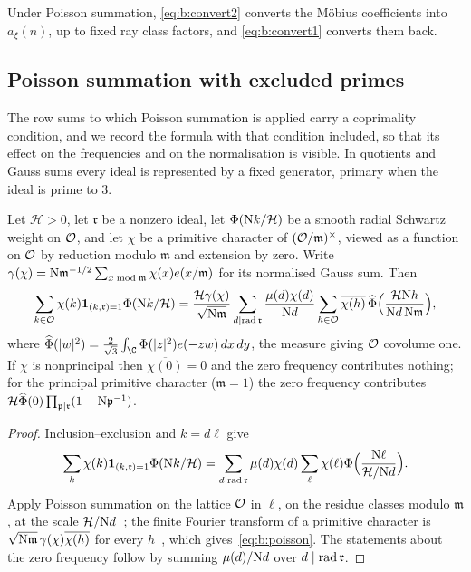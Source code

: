 Under Poisson summation, \eqref{eq:b:convert2} converts the M\"obius coefficients into $a_\xi(n)$, up to fixed ray class factors, and \eqref{eq:b:convert1} converts them back.

\subsection{Poisson summation with excluded primes}\label{ssec:b:poisson}

The row sums to which Poisson summation is applied carry a coprimality condition, and we record the formula with that condition included, so that its effect on the frequencies and on the normalisation is visible. In quotients and Gauss sums every ideal is represented by a fixed generator, primary when the ideal is prime to $3$.

\begin{lemma}\label{lem:b:poisson}
Let $\mathcal H>0$, let $\mathfrak r$ be a nonzero ideal, let $\Phi(\mathrm{N} k/\mathcal H)$ be a smooth radial Schwartz weight on $\mathcal{O}$, and let $\chi$ be a primitive character of $(\mathcal{O}/\mathfrak m)^\times$, viewed as a function on $\mathcal{O}$ by reduction modulo $\mathfrak m$ and extension by zero. Write $\gamma(\chi)=\mathrm{N}\mathfrak m^{-1/2}\sum_{x\bmod\mathfrak m}\chi(x)e(x/\mathfrak m)$ for its normalised Gauss sum. Then
\begin{equation}\label{eq:b:poisson}
  \sum_{k\in\mathcal{O}}\chi(k)\mathbf{1}_{(k,\mathfrak r)=1}\Phi(\mathrm{N} k/\mathcal H)
  =\frac{\mathcal H\gamma(\chi)}{\sqrt{\mathrm{N}\mathfrak m}}\sum_{d\mid\operatorname{rad}\mathfrak r}\frac{\mu(d)\chi(d)}{\mathrm{N} d}\sum_{h\in\mathcal{O}}\overline{\chi(h)}\,\widehat\Phi\Bigl(\frac{\mathcal H\mathrm{N} h}{\mathrm{N} d\,\mathrm{N}\mathfrak m}\Bigr),
\end{equation}
where $\widehat\Phi(|w|^2)=\frac2{\sqrt3}\int_\C\Phi(|z|^2)e(-zw)\dd x\dd y$, the measure giving $\mathcal{O}$ covolume one. If $\chi$ is nonprincipal then $\overline{\chi(0)}=0$ and the zero frequency contributes nothing; for the principal primitive character ($\mathfrak m=1$) the zero frequency contributes $\mathcal H\widehat\Phi(0)\prod_{\mathfrak p\mid\mathfrak r}(1-\mathrm{N}\mathfrak p^{-1})$.
\end{lemma}

\begin{proof}
Inclusion--exclusion and $k=d\ell$ give
\[
  \sum_k\chi(k)\mathbf{1}_{(k,\mathfrak r)=1}\Phi(\mathrm{N} k/\mathcal H)=\sum_{d\mid\operatorname{rad}\mathfrak r}\mu(d)\chi(d)\sum_\ell\chi(\ell)\Phi\Bigl(\frac{\mathrm{N}\ell}{\mathcal H/\mathrm{N} d}\Bigr).
\]
Apply Poisson summation on the lattice $\mathcal{O}$ in $\ell$, on the residue classes modulo $\mathfrak m$, at the scale $\mathcal H/\mathrm{N} d$~\cite[Theorem~4.5]{IK04}; the finite Fourier transform of a primitive character is $\sqrt{\mathrm{N}\mathfrak m}\,\gamma(\chi)\overline{\chi(h)}$ for every $h$~\cite[(3.12)]{IK04}, which gives~\eqref{eq:b:poisson}. The statements about the zero frequency follow by summing $\mu(d)/\mathrm{N} d$ over $d\mid\operatorname{rad}\mathfrak r$.
\end{proof}

